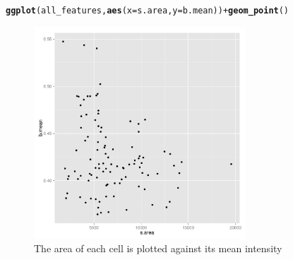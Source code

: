 \documentclass{article}\usepackage[]{graphicx}\usepackage[]{color}
\makeatletter
\newcommand{\hlopt}[1]{\textcolor[rgb]{0,0,0}{#1}}%
\newcommand{\hlstd}[1]{\textcolor[rgb]{0.345,0.345,0.345}{#1}}%
\newcommand{\hlkwc}[1]{\textcolor[rgb]{0.333,0.667,0.333}{#1}}%
\newcommand{\hlkwd}[1]{\textcolor[rgb]{0.737,0.353,0.396}{\textbf{#1}}}%
\newenvironment{kframe}{%
 \def\at@end@of@kframe{}%
 \ifinner\ifhmode%
  \def\at@end@of@kframe{\end{minipage}}%
  \begin{minipage}{\columnwidth}%
 \fi\fi%
 \def\FrameCommand##1{\hskip\@totalleftmargin \hskip-\fboxsep
 \colorbox{shadecolor}{##1}\hskip-\fboxsep
     \hskip-\linewidth \hskip-\@totalleftmargin \hskip\columnwidth}%
 \MakeFramed {\advance\hsize-\width
   \@totalleftmargin\z@ \linewidth\hsize
   \@setminipage}}%
 {\par\unskip\endMakeFramed%
 \at@end@of@kframe}
\newenvironment{knitrout}{}{} %
\makeatother
\begin{document}
\begin{knitrout}
\color{fgcolor}\begin{kframe}
\begin{alltt}
\hlkwd{ggplot}\hlstd{(all_features,} \hlkwd{aes}\hlstd{(}\hlkwc{x} \hlstd{= s.area,} \hlkwc{y} \hlstd{= b.mean))} \hlopt{+} \hlkwd{geom_point}\hlstd{()}
\end{alltt}
\end{kframe}\begin{figure}[]


{\centering \includegraphics[width=300px]{knit_figure/figscatter} 

}

\caption[The area of each cell is plotted against its mean intensity]{The area of each cell is plotted against its mean intensity\label{fig:scatter}}
\end{figure}


\end{knitrout}
\end{document}
